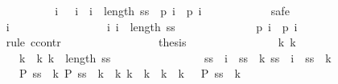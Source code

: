\begin{isabellebody}
\ \ \ \ \ \ \ \ \isamarkupfalse%
{\isacharminus}\isanewline
\ \ \ \ \ \ \ \ \ \ \isamarkupfalse%
\ {\isacharasterisk}{\isacharcolon}\ {\isachardoublequoteopen}{\isasymforall}\ i{\isachardot}\ {}\ {\isacharless}\ i\ {\isasymand}\ i\ {\isacharless}\ length\ ss\ {\isasymlongrightarrow}\ {\isacharquery}p{}\ i\ {\isacharequal}\ {\isacharquery}p{}\ {\isacharparenleft}i{\isacharminus}{}{\isacharparenright}{\isachardoublequoteclose}\isanewline
\ \ \ \ \ \ \ \ \ \ \isamarkupfalse%
\ safe\isanewline
\ \ \ \ \ \ \ \ \ \ \ \ \isamarkupfalse%
\ i\ \isanewline
\ \ \ \ \ \ \ \ \ \ \ \ \isamarkupfalse%
\ {\isachardoublequoteopen}{}\ {\isacharless}\ i{\isachardoublequoteclose}\ {\isachardoublequoteopen}i\ {\isacharless}\ length\ ss{\isachardoublequoteclose}\isanewline
\ \ \ \ \ \ \ \ \ \ \ \ \isamarkupfalse%
\ {\isachardoublequoteopen}{\isacharquery}p{}\ i\ {\isacharequal}\ {\isacharquery}p{}\ {\isacharparenleft}i{\isacharminus}{}{\isacharparenright}{\isachardoublequoteclose}\isanewline
\ \ \ \ \ \ \ \ \ \ \ \ \isamarkupfalse%
\ {\isacharparenleft}rule\ ccontr{\isacharparenright}\isanewline
\ \ \ \ \ \ \ \ \ \ \ \ \ \ \isamarkupfalse%
\ {\isachardoublequoteopen}{\isasymnot}\ {\isacharquery}thesis{\isachardoublequoteclose}\isanewline
\ \ \ \ \ \ \ \ \ \ \ \ \ \ \isamarkupfalse%
\ k{}\ k{}\ \ \isanewline
\ \ \ \ \ \ \ \ \ \ \ \ \ \ \ \ {\isachardoublequoteopen}k{}\ {\isacharless}\ k{}{\isachardoublequoteclose}\ {\isachardoublequoteopen}k{}\ {\isacharless}\ length\ {\isacharquery}ss{\isachardoublequoteclose}\isanewline
\ \ \ \ \ \ \ \ \ \ \ \ \ \ \ \ {\isachardoublequoteopen}ss\ {\isacharbang}\ {\isacharparenleft}i{\isacharminus}{}{\isacharparenright}\ {\isacharequal}\ {\isacharquery}ss\ {\isacharbang}\ k{}{\isachardoublequoteclose}\ {\isachardoublequoteopen}ss\ {\isacharbang}\ i\ {\isacharequal}\ {\isacharquery}ss\ {\isacharbang}\ k{}{\isachardoublequoteclose}\isanewline
\ \ \ \ \ \ \ \ \ \ \ \ \ \ \ \ {\isachardoublequoteopen}{\isacharquery}P\ {\isacharparenleft}{\isacharquery}ss\ {\isacharbang}\ k{}{\isacharparenright}{\isachardoublequoteclose}\ {\isachardoublequoteopen}{\isacharquery}P\ {\isacharparenleft}{\isacharquery}ss\ {\isacharbang}\ k{}{\isacharparenright}{\isachardoublequoteclose}\ {\isachardoublequoteopen}{\isasymforall}\ k{\isacharprime}{\isachardot}\ k{}\ {\isacharless}\ k{\isacharprime}\ {\isasymand}\ k{\isacharprime}\ {\isacharless}\ k{}\ {\isasymlongrightarrow}\ {\isasymnot}\ {\isacharquery}P\ {\isacharparenleft}{\isacharquery}ss\ {\isacharbang}\ k{\isacharprime}{\isacharparenright}{\isachardoublequoteclose}\isanewline

\end{isabellebody}
